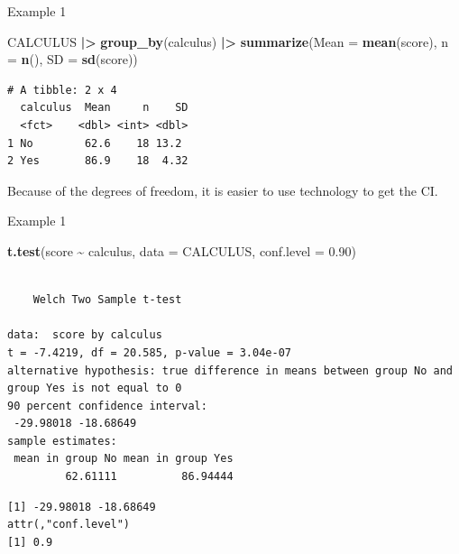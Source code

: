 \documentclass[
  ignorenonframetext,
]{beamer}
\newenvironment{Shaded}{\begin{snugshade}}{\end{snugshade}}
\newcommand{\AttributeTok}[1]{\textcolor[rgb]{0.13,0.29,0.53}{#1}}
\newcommand{\FloatTok}[1]{\textcolor[rgb]{0.00,0.00,0.81}{#1}}
\newcommand{\FunctionTok}[1]{\textcolor[rgb]{0.13,0.29,0.53}{\textbf{#1}}}
\newcommand{\NormalTok}[1]{#1}
\newcommand{\OtherTok}[1]{\textcolor[rgb]{0.56,0.35,0.01}{#1}}
\newcommand{\SpecialCharTok}[1]{\textcolor[rgb]{0.81,0.36,0.00}{\textbf{#1}}}
\begin{document}
\begin{frame}[fragile]{Example 1}
\label{example-1-2}
\small

\begin{Shaded}
\begin{Highlighting}[]
\NormalTok{CALCULUS }\SpecialCharTok{|\textgreater{}} 
  \FunctionTok{group\_by}\NormalTok{(calculus) }\SpecialCharTok{|\textgreater{}} 
  \FunctionTok{summarize}\NormalTok{(}\AttributeTok{Mean =} \FunctionTok{mean}\NormalTok{(score), }\AttributeTok{n =} \FunctionTok{n}\NormalTok{(), }\AttributeTok{SD =} \FunctionTok{sd}\NormalTok{(score))}
\end{Highlighting}
\end{Shaded}

\begin{verbatim}
# A tibble: 2 x 4
  calculus  Mean     n    SD
  <fct>    <dbl> <int> <dbl>
1 No        62.6    18 13.2 
2 Yes       86.9    18  4.32
\end{verbatim}

\normalsize

Because of the degrees of freedom, it is easier to use technology to get
the CI.
\end{frame}

\begin{frame}[fragile]{Example 1}
\label{example-1-3}
\tiny

\begin{Shaded}
\begin{Highlighting}[]
\FunctionTok{t.test}\NormalTok{(score }\SpecialCharTok{\textasciitilde{}}\NormalTok{ calculus, }\AttributeTok{data =}\NormalTok{ CALCULUS, }\AttributeTok{conf.level =} \FloatTok{0.90}\NormalTok{)}
\end{Highlighting}
\end{Shaded}

\begin{verbatim}

    Welch Two Sample t-test

data:  score by calculus
t = -7.4219, df = 20.585, p-value = 3.04e-07
alternative hypothesis: true difference in means between group No and group Yes is not equal to 0
90 percent confidence interval:
 -29.98018 -18.68649
sample estimates:
 mean in group No mean in group Yes 
         62.61111          86.94444 
\end{verbatim}

\begin{Shaded}
\end{Shaded}

\begin{verbatim}
[1] -29.98018 -18.68649
attr(,"conf.level")
[1] 0.9
\end{verbatim}

\normalsize
\end{frame}
\end{document}
